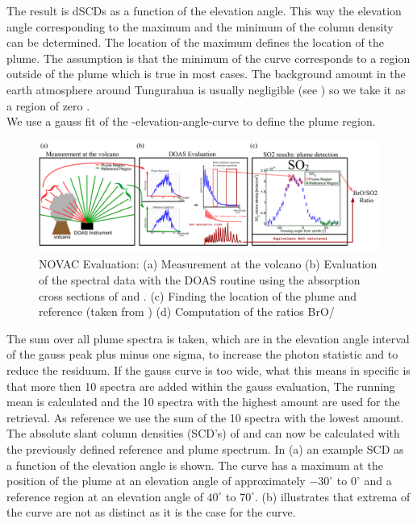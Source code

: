 The result is  dSCDs as a function of the elevation angle. This way the elevation angle corresponding to the maximum and the minimum of the  column density can be determined. The location of the  maximum defines the location of the plume. The assumption is that the minimum of the  curve corresponds to a region outside of the plume which is true in most cases. The background  amount in the earth atmosphere around Tungurahua is usually negligible (see  ) so we take it as a region of zero . \\
We use a gauss fit of the -elevation-angle-curve to define the plume region.
%
\begin{figure}
	\centering
	\includegraphics[width=1\linewidth]{Bilder/NOVAC_Eval}
	\caption{NOVAC Evaluation: (a) Measurement at the volcano (b) Evaluation of the spectral data with the DOAS routine using the absorption cross sections of   and . (c) Finding the location of the plume and reference (taken from \cite{WarnachSimon}) (d) Computation of the ratios BrO/}
	\label{fig:NOVAC_Eval}
\end{figure}
The sum over all plume spectra is taken, which are in the elevation angle interval of the gauss peak plus minus one sigma, to increase the photon statistic and to reduce the residuum. If the gauss curve is too wide, what this means in specific is that more then 10 spectra are added within the gauss evaluation, The running mean is calculated and the 10 spectra with the highest  amount are used for the retrieval. As reference we use the sum of the 10 spectra with the lowest  amount.\\
The absolute slant column densities (SCD's) of   and  can now be calculated with the previously defined reference and plume spectrum.
In  (a) an example  SCD as a function of the elevation angle is shown. The  curve has a maximum at the position of the plume at an elevation angle of approximately $-30^{\circ}$ to $0^{\circ}$  and a reference region at an elevation angle of $40^{\circ}$ to $70^{\circ}$.  (b)  illustrates that  extrema of the   curve are not as distinct as it is the case for the  curve.\\
